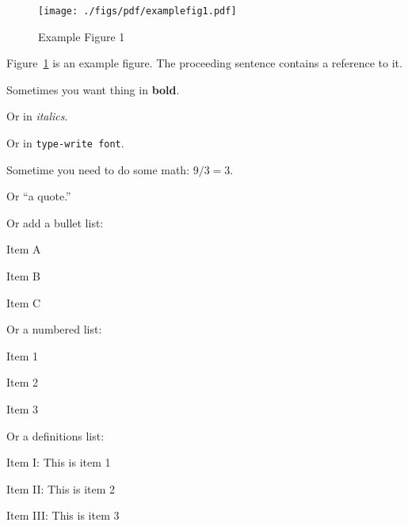 \documentclass[11pt,twocolumn,letterpaper]{article}
\begin{document}
\begin{figure}[htb]
  \centering
  \texttt{[image: ./figs/pdf/examplefig1.pdf]}
  \caption{Example Figure 1}
  \label{fig:example1}
\end{figure}

\noindent
Figure~\ref{fig:example1} is an example figure. The proceeding
sentence contains a reference to it.

\noindent
Sometimes you want thing in {\bf bold}.

\noindent
Or in {\em italics}.

\noindent
Or in \texttt{type-write font}.

\noindent
Sometime you need to do some math: $9/3=3$.

\noindent
Or ``a quote.''

\noindent
Or add a bullet list:

\begin{packed_item}
\item Item A
\item Item B
\item Item C
\end{packed_item}

\noindent
Or a numbered list:

\begin{packed_enum}
\item Item 1
\item Item 2
\item Item 3
\end{packed_enum}

\noindent
Or a definitions list:

\begin{packed_desc}
\item[Item I:] This is item 1 
\item[Item II:] This is item 2
\item[Item III:] This is item 3
\end{packed_desc}




\end{document}
